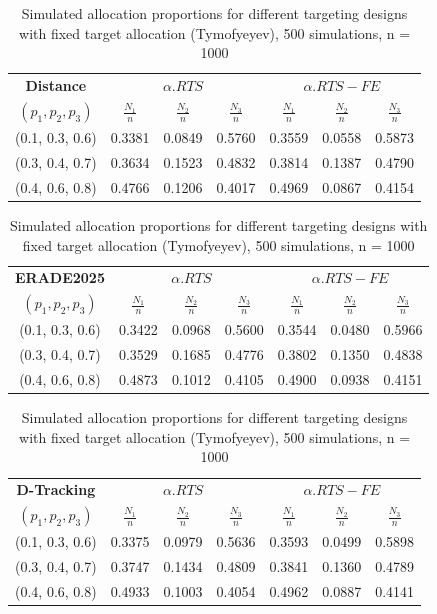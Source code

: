 \begin{table}[tb]
	\centering
	\small
	\begin{tabular}{c|ccc|ccc}
		\hline
		\textbf{Distance} & \multicolumn{3}{c|}{\(\alpha.RTS\)} & \multicolumn{3}{c}{\(\alpha.RTS-FE\)} \\
		$(p_1, p_2, p_3)$
		& $\frac{N_1}{n}$ & $\frac{N_2}{n}$ & $\frac{N_3}{n}$
		& $\frac{N_1}{n}$ & $\frac{N_2}{n}$ & $\frac{N_3}{n}$ \\
		\hline
		(0.1, 0.3, 0.6) & 0.3381 & 0.0849 & 0.5760 & 0.3559 & 0.0558 & 0.5873 \\
		(0.3, 0.4, 0.7) & 0.3634 & 0.1523 & 0.4832 & 0.3814 & 0.1387 & 0.4790 \\
		(0.4, 0.6, 0.8) & 0.4766 & 0.1206 & 0.4017 & 0.4969 & 0.0867 & 0.4154 \\
		\hline
	\end{tabular}
	
\vspace{0.4cm}

	\begin{tabular}{c|ccc|ccc}
		\hline
		\textbf{ERADE2025} & \multicolumn{3}{c|}{\(\alpha.RTS\)} & \multicolumn{3}{c}{\(\alpha.RTS-FE\)} \\
		$(p_1, p_2, p_3)$
		& $\frac{N_1}{n}$ & $\frac{N_2}{n}$ & $\frac{N_3}{n}$
		& $\frac{N_1}{n}$ & $\frac{N_2}{n}$ & $\frac{N_3}{n}$ \\
		\hline
		(0.1, 0.3, 0.6) & 0.3422 & 0.0968 & 0.5600 & 0.3544 & 0.0480 & 0.5966 \\
		(0.3, 0.4, 0.7) & 0.3529 & 0.1685 & 0.4776 & 0.3802 & 0.1350 & 0.4838 \\
		(0.4, 0.6, 0.8) & 0.4873 & 0.1012 & 0.4105 & 0.4900 & 0.0938 & 0.4151 \\
		\hline
	\end{tabular}
	
\vspace{0.4cm}

	\begin{tabular}{c|ccc|ccc}
		\hline
		\textbf{D-Tracking} & \multicolumn{3}{c|}{\(\alpha.RTS\)} & \multicolumn{3}{c}{\(\alpha.RTS-FE\)} \\
		$(p_1, p_2, p_3)$
		& $\frac{N_1}{n}$ & $\frac{N_2}{n}$ & $\frac{N_3}{n}$
		& $\frac{N_1}{n}$ & $\frac{N_2}{n}$ & $\frac{N_3}{n}$ \\
		\hline
		(0.1, 0.3, 0.6) & 0.3375 & 0.0979 & 0.5636 & 0.3593 & 0.0499 & 0.5898 \\
		(0.3, 0.4, 0.7) & 0.3747 & 0.1434 & 0.4809 & 0.3841 & 0.1360 & 0.4789 \\
		(0.4, 0.6, 0.8) & 0.4933 & 0.1003 & 0.4054 & 0.4962 & 0.0887 & 0.4141 \\
		\hline
	\end{tabular}
	
\vspace{0.4cm}

	\caption{Simulated allocation proportions for different targeting designs with fixed target allocation (Tymofyeyev), 500 simulations, n = 1000}
	\label{tab:sparse-target}
\end{table}